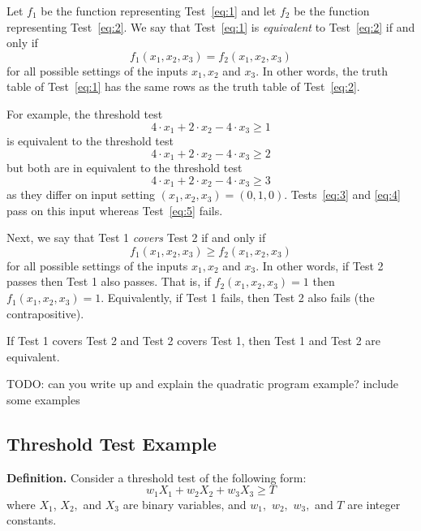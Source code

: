 \documentclass[]{article}
\begin{document}
Let \(f_1\) be the function representing Test~\ref{eq:1} and let \(f_2\) be the function representing Test~\ref{eq:2}.  We say that Test~\ref{eq:1} is \emph{equivalent} to Test~\ref{eq:2} if and only if 
\[
f_1(x_1,x_2,x_3) = f_2(x_1,x_2,x_3)
\]
for all possible settings of the inputs \(x_1,x_2\) and \(x_3\).  In other words, the truth table of Test~\ref{eq:1} has the same rows as the truth table of Test~\ref{eq:2}.

For example, the threshold test
\begin{equation} \label{eq:3}
4 \cdot x_1 + 2 \cdot x_2 - 4 \cdot x_3 \ge 1
\end{equation}
is equivalent to the threshold test
\begin{equation} \label{eq:4}
4 \cdot x_1 + 2 \cdot x_2 - 4 \cdot x_3 \ge 2
\end{equation}
but both are in equivalent to the threshold test
\begin{equation} \label{eq:5}
4 \cdot x_1 + 2 \cdot x_2 - 4 \cdot x_3 \ge 3
\end{equation}
as they differ on input setting \((x_1,x_2,x_3) = (0,1,0).\)  Tests~\ref{eq:3} and \ref{eq:4} pass on this input whereas Test~\ref{eq:5} fails.

Next, we say that Test 1 \emph{covers} Test 2 if and only if
\[
f_1(x_1,x_2,x_3) \ge f_2(x_1,x_2,x_3)
\]
for all possible settings of the inputs \(x_1,x_2\) and \(x_3\).  In other words, if Test 2 passes then Test 1 also passes.  That is, if \(f_2(x_1,x_2,x_3) = 1\) then \(f_1(x_1,x_2,x_3) = 1\).  Equivalently, if Test 1 fails, then Test 2 also fails (the contrapositive).

If Test 1 covers Test 2 and Test 2 covers Test 1, then Test 1 and Test 2 are equivalent.

TODO: can you write up and explain the quadratic program example?  include some examples

\newpage

\subsection*{Threshold Test Example}

\textbf{Definition.} Consider a threshold test of the following form:
\[
w_1 X_1 + w_2 X_2 + w_3 X_3 \ge T
\]
where \(X_1\), \(X_2,\) and \(X_3\) are binary variables, and \(w_1,\) \(w_2,\) \(w_3,\) and \(T\) are integer constants.

\end{document}
